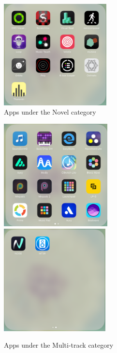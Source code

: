 \bigskip
\begin{figure}[h]
  \includegraphics[width=0.5\textwidth]{images/Novel.png}
  \centering
  \caption{Apps under the Novel category}
  \label{fig: Novel}
\end{figure}
\bigskip

\bigskip
\begin{figure}[h]
  \includegraphics[width=0.505\textwidth]{images/Multi-track2.png}
  \includegraphics[width=0.495\textwidth]{images/Multi-track1.png}
  \caption{Apps under the Multi-track category}
  \label{fig: Multi}
\end{figure}
\bigskip

